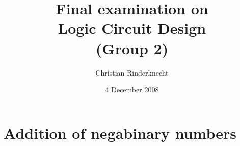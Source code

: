 \documentclass[11pt,a4paper]{article}
\title{Final examination on\\ Logic Circuit Design\\ (Group 2)}
\author{Christian Rinderknecht}
\date{4 December 2008}
\begin{document}
\maketitle
\thispagestyle{empty}

\section{Addition of negabinary numbers}


\end{document}

